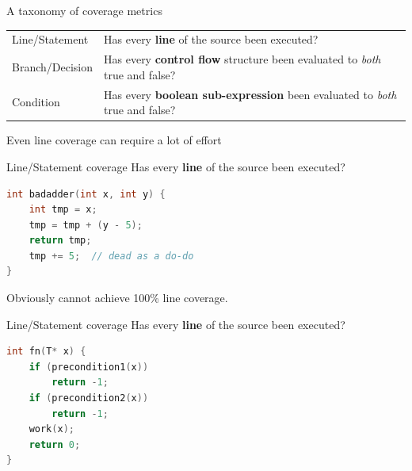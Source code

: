 \documentclass[xcolor = {dvipsnames, table}, aspectratio=169]{beamer}
\begin{document}
\begin{frame}
    \begin{block}{A taxonomy of coverage metrics}
    \end{block}

    \begin{block}{}
        \begin{tabularx}{\textwidth}{l X}
            Line/Statement &
                Has every \textbf{line} of the source been executed? \\
            Branch/Decision &
                Has every \textbf{control flow} structure been evaluated to
                \emph{both} true and false? \\
            Condition &
                Has every \textbf{boolean sub-expression} been evaluated to
                \emph{both} true and false? \\
        \end{tabularx}
    \end{block}

    \pause
    Even line coverage can require a lot of effort
\end{frame}

\begin{frame}[fragile]
    \begin{block}{Line/Statement coverage}
        Has every \textbf{line} of the source been executed?
    \end{block}

    \begin{lstlisting}[language = C]
int badadder(int x, int y) {
    int tmp = x;
    tmp = tmp + (y - 5);
    return tmp;
    tmp += 5;  // dead as a do-do
}
    \end{lstlisting}

    Obviously cannot achieve 100\% line coverage.
\end{frame}

\begin{frame}[fragile]
    \begin{block}{Line/Statement coverage}
        Has every \textbf{line} of the source been executed?
    \end{block}

    \begin{lstlisting}[language = C]
int fn(T* x) {
    if (precondition1(x))
        return -1;
    if (precondition2(x))
        return -1;
    work(x);
    return 0;
}
    \end{lstlisting}
\end{frame}
\end{document}
